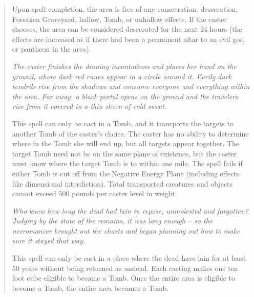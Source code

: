 \begin{quote}
Upon spell completion, the area is free of any consecration, desecration, Forsaken Graveyard, hallow, Tomb, or unhallow effects. If the caster chooses, the area can be considered desecrated for the next 24 hours (the effects are increased as if there had been a permanent altar to an evil god or pantheon in the area).


\begin{small}
\end{small}
\emph{The caster finishes the droning incantations and places her hand on the ground, where dark red runes appear in a circle around it. Eerily dark tendrils rise from the shadows and consume everyone and everything within the area. Far away, a black portal opens on the ground and the travelers rise from it covered in a thin sheen of cold sweat.}

This spell can only be cast in a Tomb, and it transports the targets to another Tomb of the caster's choice. The caster has no ability to determine where in the Tomb she will end up, but all targets appear together. The target Tomb need not be on the same plane of existence, but the caster must know where the target Tomb is to within one mile. The spell fails if either Tomb is cut off from the Negative Energy Plane (including effects like dimensional interdiction). Total transported creatures and objects cannot exceed 500 pounds per caster level in weight.\\

\begin{small}
\end{small}
\emph{Who knew how long the dead had lain in repose, unmolested and forgotten? Judging by the state of the remains, it was long enough -- so the necromancer brought out the charts and began planning out how to make sure it stayed that way.}

This spell can only be cast in a place where the dead have lain for at least 50 years without being returned as undead. Each casting makes one ten foot cube eligible to become a Tomb. Once the entire area is eligible to become a Tomb, the entire area becomes a Tomb.

\end{quote}
